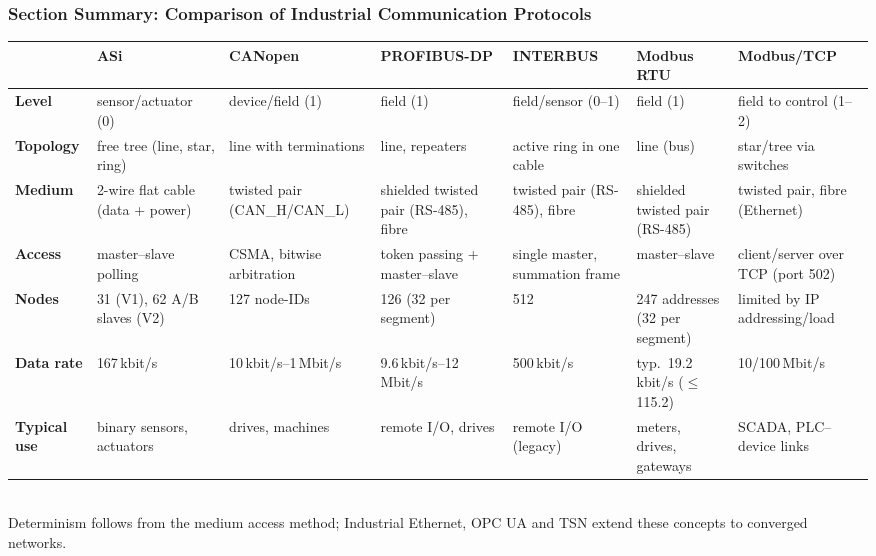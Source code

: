 \begin{frame}
	\frametitle{Section Summary: Comparison of Industrial Communication Protocols}
	\scriptsize
	\setlength{\tabcolsep}{3pt}
	\begin{tabular}{@{}L{0.1\textwidth}L{0.135\textwidth}L{0.135\textwidth}L{0.15\textwidth}L{0.135\textwidth}L{0.135\textwidth}L{0.135\textwidth}@{}}
		\toprule
		& \textbf{ASi} & \textbf{CANopen} & \textbf{PROFIBUS-DP} & \textbf{INTERBUS} & \textbf{Modbus RTU} & \textbf{Modbus/TCP}\\
		\midrule
		\textbf{Level} & sensor/actuator (0) & device/field (1) & field (1) & field/sensor (0--1) & field (1) & field to control (1--2)\\
		\textbf{Topology} & free tree (line, star, ring) & line with terminations & line, repeaters & active ring in one cable & line (bus) & star/tree via switches\\
		\textbf{Medium} & 2-wire flat cable (data + power) & twisted pair (CAN\_H/CAN\_L) & shielded twisted pair (RS-485), fibre & twisted pair (RS-485), fibre & shielded twisted pair (RS-485) & twisted pair, fibre (Ethernet)\\
		\textbf{Access} & master--slave polling & CSMA, bitwise arbitration & token passing + master--slave & single master, summation frame & master--slave & client/server over TCP (port 502)\\
		\textbf{Nodes} & 31 (V1), 62 A/B slaves (V2) & 127 node-IDs & 126 (32 per segment) & 512 & 247 addresses (32 per segment) & limited by IP addressing/load\\
		\textbf{Data rate} & 167\,kbit/s & 10\,kbit/s--1\,Mbit/s & 9.6\,kbit/s--12\,Mbit/s & 500\,kbit/s & typ.\ 19.2\,kbit/s ($\leq$ 115.2) & 10/100\,Mbit/s\\
		\textbf{Typical use} & binary sensors, actuators & drives, machines & remote I/O, drives & remote I/O (legacy) & meters, drives, gateways & SCADA, PLC--device links\\
		\bottomrule
	\end{tabular}\\[2mm]
	\footnotesize Determinism follows from the medium access method; Industrial Ethernet, OPC UA and TSN extend these concepts to converged networks.
\end{frame}
